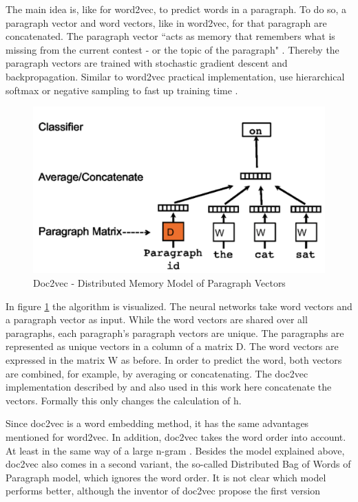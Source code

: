 \documentclass[12pt, a4paper, titlepage]{article}
\begin{document}
The main idea is, like for word2vec, to predict words in a paragraph. To do so, a paragraph vector and word vectors, like in word2vec, for that paragraph are concatenated. The paragraph vector ``acts as memory that remembers what is missing from the current contest - or the topic of the paragraph" \citep[3]{le2014}. Thereby the paragraph vectors are trained with stochastic gradient descent and backpropagation. Similar to word2vec practical implementation, use hierarchical softmax or negative sampling to fast up training time \citep{lau2016}. 

\begin{figure}[]
  \center
  \includegraphics[scale=0.5]{doc2vec.png}
  \caption{\label{fig: F2} Doc2vec - Distributed Memory Model of Paragraph Vectors \citep[3]{le2014}}
\end{figure}

In figure \ref{fig: F2} the algorithm is visualized. The neural networks take word vectors and a paragraph vector as input. While the word vectors are shared over all paragraphs, each paragraph's paragraph vectors are unique. The paragraphs are represented as unique vectors in a column of a matrix D. The word vectors are expressed in the matrix W as before. In order to predict the word, both vectors are combined, for example, by averaging or concatenating. The doc2vec implementation described by \citet{le2014} and also used in this work here concatenate the vectors. Formally this only changes the calculation of h. \citep{lau2016}

Since doc2vec is a word embedding method, it has the same advantages mentioned for word2vec. In addition, doc2vec takes the word order into account. At least in the same way of a large n-gram \citep{le2014}. Besides the model explained above, doc2vec also comes in a second variant, the so-called Distributed Bag of Words of Paragraph model, which ignores the word order. It is not clear which model performs better, although the inventor of doc2vec propose the first version \citep{lau2016}
\end{document}
